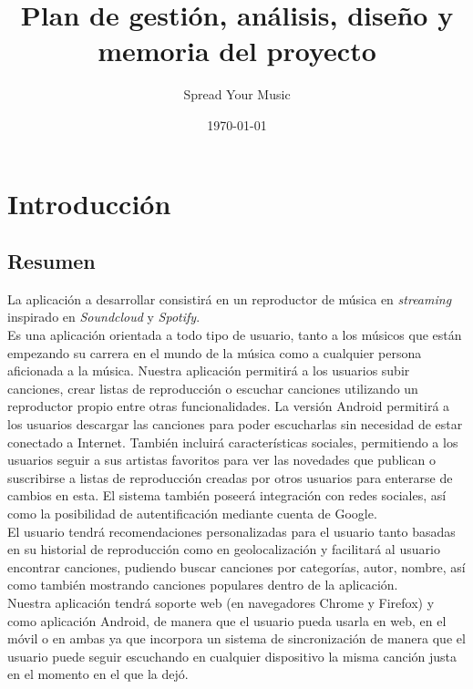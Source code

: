 \documentclass[12pt]{article}%
\begin{document}
\title{Plan de gesti\'on, an\'alisis, dise\~no y memoria del proyecto}
\author{Spread Your Music}
\date{\today}
\maketitle

\tableofcontents

\newpage


\section{Introducci\'on}

\subsection{Resumen}

La aplicaci\'on a desarrollar consistir\'a en un reproductor de m\'usica en \textit{streaming} inspirado en \textit{Soundcloud} y \textit{Spotify}.\\ 

Es una aplicaci\'on orientada a todo tipo de usuario, tanto a los m\'usicos que est\'an empezando su carrera en el mundo de la m\'usica como a cualquier persona aficionada a la m\'usica. Nuestra aplicaci\'on permitir\'a a los usuarios subir canciones, crear listas de reproducci\'on o escuchar canciones utilizando un reproductor propio entre otras funcionalidades. La versi\'on Android permitir\'a a los usuarios descargar las canciones para poder escucharlas sin necesidad de estar conectado a Internet. Tambi\'en incluir\'a caracter\'isticas sociales, permitiendo a los usuarios seguir a sus artistas favoritos para ver las novedades que publican o suscribirse a listas de reproducci\'on creadas por otros usuarios para enterarse de cambios en esta. El sistema tambi\'en poseer\'a integraci\'on con redes sociales, as\'i como la posibilidad de autentificaci\'on mediante cuenta de Google.\\

El usuario tendr\'a recomendaciones personalizadas para el usuario tanto basadas en su historial de reproducci\'on como en geolocalizaci\'on y facilitar\'a al usuario encontrar canciones, pudiendo buscar canciones por categor\'ias, autor, nombre, as\'i como tambi\'en mostrando canciones populares dentro de la aplicaci\'on.\\

Nuestra aplicaci\'on tendr\'a soporte web (en navegadores Chrome y Firefox) y como aplicaci\'on Android, de manera que el usuario pueda usarla en web, en el m\'ovil o en ambas ya que incorpora un sistema de sincronizaci\'on de manera que el usuario puede seguir escuchando en cualquier dispositivo la misma canci\'on justa en el momento en el que la dej\'o. \\
\end{document}
